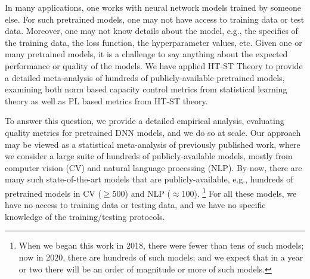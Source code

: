 \documentclass{article}
\begin{document}
In many applications, one works with neural network models trained by someone else.
For such pretrained models, one may not have access to training data or test data.
Moreover, one may not know details about the model, e.g., the specifics of the training data, the loss function, the hyperparameter values, etc.
Given one or many pretrained models, it is a challenge to say anything about the expected performance or quality of the models.
We have applied HT-ST Theory to provide a detailed meta-analysis of hundreds of publicly-available pretrained models, examining both 
norm based capacity control metrics from statistical learning theory as well as PL based metrics from HT-ST theory.

To answer this question, we provide a detailed empirical analysis, evaluating quality metrics for pretrained DNN models, and we do so at scale.
Our approach may be viewed as a statistical meta-analysis of previously published work, where we consider a large suite of hundreds of publicly-available models, mostly from computer vision (CV) and natural language processing (NLP).
By now, there are many such state-of-the-art models that are publicly-available, e.g., 
hundreds of pretrained models in CV ($\ge 500$) and NLP ($\approx 100$).%
\footnote{When we began this work in 2018, there were fewer than tens of such models; now in 2020, there are hundreds of such models; and we expect that in a year or two there will be an order of magnitude or more of such models.}
For all these models, we have no access to training data or testing data, and we have no specific knowledge of the training/testing protocols. 
\end{document}
